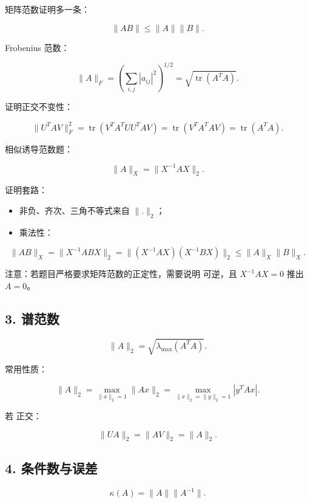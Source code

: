 \documentclass[11pt,a4paper]{ctexart}
\newcommand{\code}[1]{\begingroup\ttfamily\small #1\endgroup}
\begin{document}
矩阵范数证明多一条：

\[
\|AB\|\le \|A\|\|B\|.
\]

Frobenius 范数：

\[
\|A\|_F=\left(\sum_{i,j}|a_{ij}|^2\right)^{1/2}
=\sqrt{\operatorname{tr}(A^TA)}.
\]

证明正交不变性：

\[
\|U^TAV\|_F^2
=\operatorname{tr}(V^T A^T U U^T A V)
=\operatorname{tr}(V^T A^T A V)
=\operatorname{tr}(A^T A).
\]

相似诱导范数题：

\[
\|A\|_X=\|X^{-1}AX\|_2.
\]

证明套路：

\begin{itemize}

\item 非负、齐次、三角不等式来自 $\|.\|_2$；

\item 乘法性：

\end{itemize}

\[
\|AB\|_X=\|X^{-1}ABX\|_2
=\|(X^{-1}AX)(X^{-1}BX)\|_2
\le \|A\|_X\|B\|_X.
\]

注意：若题目严格要求矩阵范数的正定性，需要说明 \code{} 可逆，且 $X^{-1}AX=0$ 推出 $A=0$。


\subsection*{3. 谱范数}


\[
\|A\|_2=\sqrt{\lambda_{\max}(A^TA)}.
\]

常用性质：

\[
\|A\|_2=\max_{\|x\|_2=1}\|Ax\|_2
=\max_{\|x\|_2=\|y\|_2=1}|y^TAx|.
\]

若 \code{} 正交：

\[
\|UA\|_2=\|AV\|_2=\|A\|_2.
\]


\subsection*{4. 条件数与误差}


\[
\kappa(A)=\|A\|\|A^{-1}\|.
\]
\end{document}
